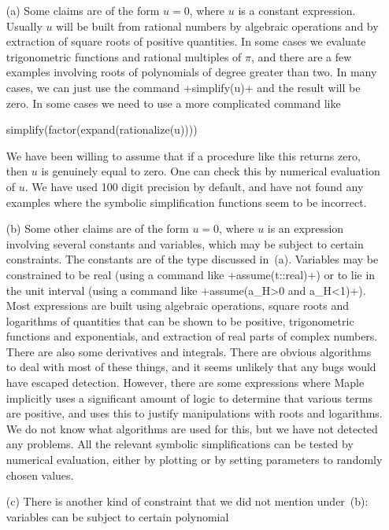 \documentclass[reqno]{amsart}
\renewcommand{\:}{\colon}
\theoremstyle{definition}
\begin{document}
\begin{itemize}
 \item[(a)] Some claims are of the form $u=0$, where $u$ is a constant
  expression.  Usually $u$ will be built from rational numbers by
  algebraic operations and by extraction of square roots of positive
  quantities.  In some cases we evaluate trigonometric functions and
  rational multiples of $\pi$, and there are a few examples involving
  roots of polynomials of degree greater than two.  In many cases, we
  can just use the command \mcode+simplify(u)+ and the result will be
  zero.  In some cases we need to use a more complicated command like
\begin{mcodeblock}
   simplify(factor(expand(rationalize(u))))
\end{mcodeblock}
  We have been willing to assume that if a procedure like this returns
  zero, then $u$ is genuinely equal to zero.  One can check this by
  numerical evaluation of $u$.  We have used 100 digit precision by
  default, and have not found any examples where the symbolic
  simplification functions seem to be incorrect.
 \item[(b)] Some other claims are of the form $u=0$, where $u$ is an
  expression involving several constants and variables, which may be
  subject to certain constraints.  The constants are of the type
  discussed in~(a).  Variables may be constrained to be real (using
  a command like \mcode+assume(t::real)+) or to lie in the unit
  interval (using a command like \mcode+assume(a_H>0 and a_H<1)+).
  Most expressions are built using algebraic operations, square roots
  and logarithms of quantities that can be shown to be positive,
  trigonometric functions and exponentials, and extraction of real
  parts of complex numbers.  There are also some derivatives and
  integrals.  There are obvious algorithms to deal with most of these
  things, and it seems unlikely that any bugs would have escaped
  detection.  However, there are some expressions where Maple
  implicitly uses a significant amount of logic to determine that
  various terms are positive, and uses this to justify manipulations
  with roots and logarithms.  We do not know what algorithms are used
  for this, but we have not detected any problems.  All the relevant
  symbolic simplifications can be tested by numerical evaluation,
  either by plotting or by setting parameters to randomly chosen values.
 \item[(c)] There is another kind of constraint that we did not
  mention under~(b): variables can be subject to certain polynomial

\end{itemize}
\end{document}
